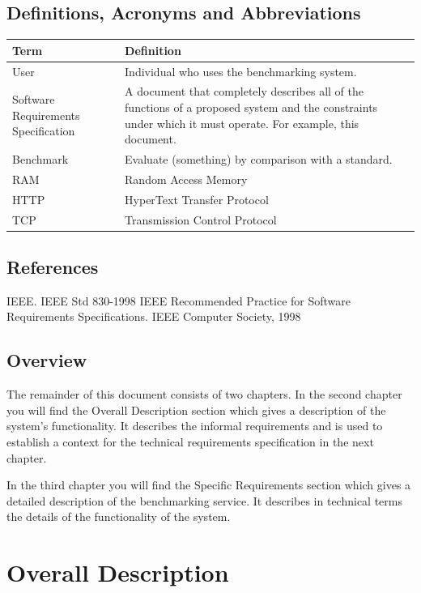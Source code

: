\documentclass[a4paper,12pt]{article}
\begin{document}
\subsection{Definitions, Acronyms and Abbreviations}
\begin{center}
\begin{tabular}{ |p{5cm}|p{10cm}| } 
\hline
Term & Definition \\ 
\hline
User & Individual who uses the benchmarking system. \\ 
\hline
Software Requirements Specification & A document that completely describes all of the functions of a proposed system and the constraints under which it must operate. For example, this document. \\ 
\hline
Benchmark & Evaluate (something) by comparison with a standard. \\
\hline
RAM & Random Access Memory  \\
\hline
HTTP & HyperText Transfer Protocol \\
\hline
TCP & Transmission Control Protocol\\
\hline
\end{tabular}
\end{center}

\subsection{References}
IEEE. IEEE Std 830-1998 IEEE Recommended Practice for Software Requirements Specifications. IEEE Computer Society, 1998

\subsection{Overview}
The remainder of this document consists of two chapters. In the second chapter you will find the Overall Description section which gives a description of the system's functionality. It describes the informal requirements and is used to establish a context for the technical requirements specification in the next chapter.

In the third chapter you will find the Specific Requirements section which gives a detailed description of the benchmarking service. It describes in technical terms the details of the functionality of the system.

\section{Overall Description}
\end{document}
